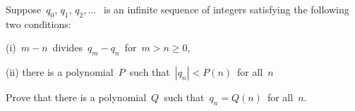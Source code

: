 Suppose $\, q_{0}, \, q_{1}, \, q_{2}, \ldots \; \,$ is an infinite sequence of integers satisfying the following two conditions:

(i)  $\, m-n \,$ divides $\, q_{m}-q_{n}\,$ for $\, m > n \geq 0,$

(ii) there is a polynomial $\, P \,$ such that $\, |q_{n}| < P(n) \,$ for all $\, n$

Prove that there is a polynomial $\, Q \,$ such that $\, q_{n}= Q(n) \,$ for all $\, n$.